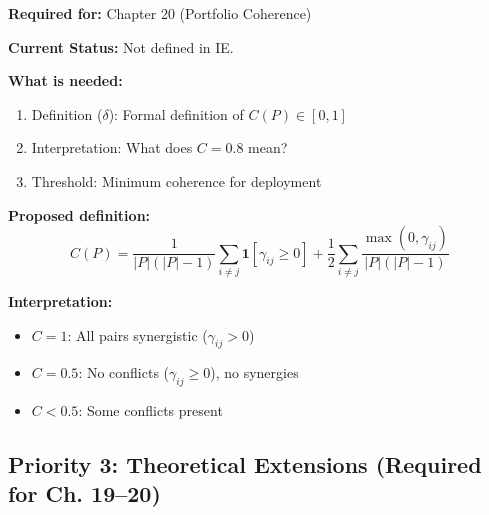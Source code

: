 \begin{tcolorbox}[colback=yellow!5!white, colframe=yellow!75!black,
    title=\textbf{TODO-UNMAPPED_IE-6: Coherence Score Definition $C(P)$}]

\textbf{Required for:} Chapter 20 (Portfolio Coherence)

\textbf{Current Status:} Not defined in IE.

\textbf{What is needed:}
\begin{enumerate}[nosep]
    \item Definition ($\delta$): Formal definition of $C(P) \in [0,1]$
    \item Interpretation: What does $C = 0.8$ mean?
    \item Threshold: Minimum coherence for deployment
\end{enumerate}

\textbf{Proposed definition:}
\[
C(P) = \frac{1}{|P|(|P|-1)} \sum_{i \neq j} \mathbf{1}[\gamma_{ij} \geq 0] + \frac{1}{2} \sum_{i \neq j} \frac{\max(0, \gamma_{ij})}{|P|(|P|-1)}
\]

\textbf{Interpretation:}
\begin{itemize}[nosep]
    \item $C = 1$: All pairs synergistic ($\gamma_{ij} > 0$)
    \item $C = 0.5$: No conflicts ($\gamma_{ij} \geq 0$), no synergies
    \item $C < 0.5$: Some conflicts present
\end{itemize}

\end{tcolorbox}

\subsection{Priority 3: Theoretical Extensions (Required for Ch. 19--20)}

